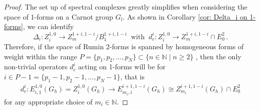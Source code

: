 \documentclass[dvipsnames]{amsart}
\theoremstyle{definition}
\theoremstyle{definition}
\numberwithin{equation}{section}
\newcommand{\N}{\mathbb{N}}
\begin{document}
\begin{proof}
   The set up of spectral complexes greatly simplifies when considering the space of 1-forms on a Carnot group $G_l$. As shown in Corollary \ref{cor: Delta_i on 1-forms}, we can identify 
   $$\Delta_i\colon Z_i^{1,0}\longrightarrow Z_m^{1+i,1-i}/B_1^{1+i,1-i}\ \text{ with } \ d_c^i\colon Z_i^{1,0}\longrightarrow Z_m^{1+i,1-i}\cap E_0^2\,.$$
   Therefore, if the space of Rumin 2-forms is spanned by homogeneous forms of weight within the range $P=\{p_1,p_2,\ldots,p_N\}\subset\{n\in\N\mid n\ge 2\} $ , then the only non-trivial operators $d_c^i$ acting on 1-forms will be for $i\in P-1= \{p_1-1,p_2-1,\ldots,p_N-1\}$, that is
   \begin{align*}
       d_c^i\colon E_{i,1}^{1,0}(G_h)=Z_i^{1,0}(G_h)\longrightarrow E_{m_i,i}^{i+1,1-i}(G_h)\cong Z_{m_i}^{i+1,1-i}(G_h)\cap E_0^2
   \end{align*}
   for any appropriate choice of $m_i\in\N$. 


\end{proof}
\end{document}
